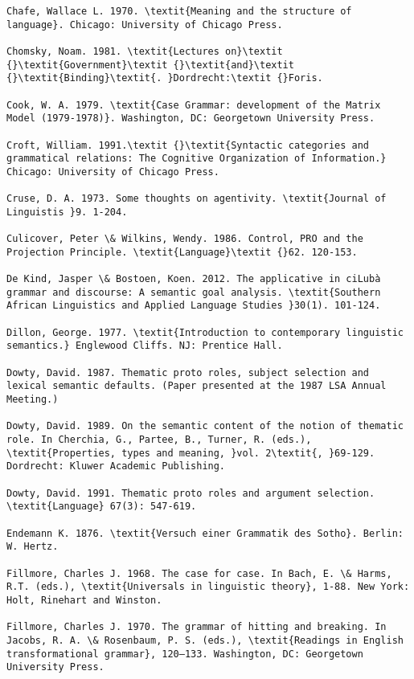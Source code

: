 \documentclass[output=paper]{langsci/langscibook}
\begin{document}
\begin{verbatim}
Chafe, Wallace L. 1970. \textit{Meaning and the structure of language}. Chicago: University of Chicago Press.

Chomsky, Noam. 1981. \textit{Lectures on}\textit {}\textit{Government}\textit {}\textit{and}\textit {}\textit{Binding}\textit{. }Dordrecht:\textit {}Foris.

Cook, W. A. 1979. \textit{Case Grammar: development of the Matrix Model (1979-1978)}. Washington, DC: Georgetown University Press.

Croft, William. 1991.\textit {}\textit{Syntactic categories and grammatical relations: The Cognitive Organization of Information.} Chicago: University of Chicago Press.

Cruse, D. A. 1973. Some thoughts on agentivity. \textit{Journal of Linguistis }9. 1-204.

Culicover, Peter \& Wilkins, Wendy. 1986. Control, PRO and the Projection Principle. \textit{Language}\textit {}62. 120-153.

De Kind, Jasper \& Bostoen, Koen. 2012. The applicative in ciLubà grammar and discourse: A semantic goal analysis. \textit{Southern African Linguistics and Applied Language Studies }30(1). 101-124.

Dillon, George. 1977. \textit{Introduction to contemporary linguistic semantics.} Englewood Cliffs. NJ: Prentice Hall.

Dowty, David. 1987. Thematic proto roles, subject selection and lexical semantic defaults. (Paper presented at the 1987 LSA Annual Meeting.)

Dowty, David. 1989. On the semantic content of the notion of thematic role. In Cherchia, G., Partee, B., Turner, R. (eds.), \textit{Properties, types and meaning, }vol. 2\textit{, }69-129. Dordrecht: Kluwer Academic Publishing.

Dowty, David. 1991. Thematic proto roles and argument selection. \textit{Language} 67(3): 547-619.

Endemann K. 1876. \textit{Versuch einer Grammatik des Sotho}. Berlin: W. Hertz. 

Fillmore, Charles J. 1968. The case for case. In Bach, E. \& Harms, R.T. (eds.), \textit{Universals in linguistic theory}, 1-88. New York: Holt, Rinehart and Winston. 

Fillmore, Charles J. 1970. The grammar of hitting and breaking. In Jacobs, R. A. \& Rosenbaum, P. S. (eds.), \textit{Readings in English transformational grammar}, 120–133. Washington, DC: Georgetown University Press.


\end{verbatim}
\end{document}
